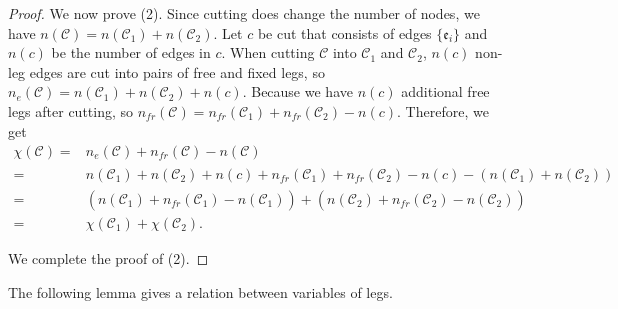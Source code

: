 \begin{proof}
We now prove (2). Since cutting does change the number of nodes, we have $n(\mathcal{C})=n(\mathcal{C}_1)+n(\mathcal{C}_2)$. Let $c$ be cut that consists of edges $\{\mathfrak{e}_{i}\}$ and $n(c)$ be the number of edges in $c$. 
When cutting $\mathcal{C}$ into $\mathcal{C}_1$ and $\mathcal{C}_2$, $n(c)$ non-leg edges are cut into pairs of free and fixed legs, so $n_e(\mathcal{C})=n(\mathcal{C}_1)+n(\mathcal{C}_2)+n(c)$. Because we have $n(c)$ additional free legs after cutting, so $n_{\textit{fr}}(\mathcal{C})=n_{\textit{fr}}(\mathcal{C}_1)+n_{\textit{fr}}(\mathcal{C}_2)-n(c)$. Therefore, we get
\begin{equation}
\begin{split}
 \chi(\mathcal{C})=&n_e(\mathcal{C})+n_{\textit{fr}}(\mathcal{C})-n(\mathcal{C})
 \\
 =&n(\mathcal{C}_1)+n(\mathcal{C}_2)+n(c)+n_{\textit{fr}}(\mathcal{C}_1)+n_{\textit{fr}}(\mathcal{C}_2)-n(c)-(n(\mathcal{C}_1)+n(\mathcal{C}_2))
 \\
 =&(n(\mathcal{C}_1)+n_{\textit{fr}}(\mathcal{C}_1)-n(\mathcal{C}_1))+(n(\mathcal{C}_2)+n_{\textit{fr}}(\mathcal{C}_2)-n(\mathcal{C}_2))
 \\
 =&\chi(\mathcal{C}_1)+\chi(\mathcal{C}_2).
\end{split}
\end{equation}

We complete the proof of (2).
\end{proof}

The following lemma gives a relation between variables of legs.

